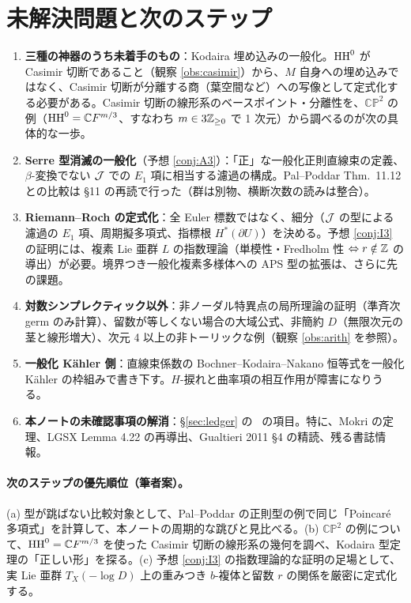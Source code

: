 \section{未解決問題と次のステップ}\label{sec:open}
\begin{enumerate}
\item \textbf{三種の神器のうち未着手のもの}：Kodaira 埋め込みの一般化。$\mathrm{HH}^0$ が Casimir 切断であること（観察 \ref{obs:casimir}）から、$M$ 自身への埋め込みではなく、Casimir 切断が分離する商（葉空間など）への写像として定式化する必要がある。Casimir 切断の線形系のベースポイント・分離性を、$\mathbb{CP}^2$ の例（$\mathrm{HH}^0=\mathbb C F^{m/3}$、すなわち $m\in3\mathbb Z_{\ge0}$ で 1 次元）から調べるのが次の具体的な一歩。
\item \textbf{Serre 型消滅の一般化}（予想 \ref{conj:A3}）：「正」な一般化正則直線束の定義、$\beta$-変換でない $\mathcal J$ での $E_1$ 項に相当する濾過の構成。Pal--Poddar Thm.\ 11.12 との比較は \S11 の再読で行った（群は別物、横断次数の読みは整合）。
\item \textbf{Riemann--Roch の定式化}：全 Euler 標数ではなく、細分（$\mathcal J$ の型による濾過の $E_1$ 項、周期擬多項式、指標根 $H^*(\partial U)$）を決める。予想 \ref{conj:I3} の証明には、複素 Lie 亜群 $L$ の指数理論（単模性・Fredholm 性 $\Leftrightarrow r\notin\mathbb Z$ の導出）が必要。境界つき一般化複素多様体への APS 型の拡張は、さらに先の課題。
\item \textbf{対数シンプレクティック以外}：非ノーダル特異点の局所理論の証明（準斉次 germ のみ計算）、留数が等しくない場合の大域公式、非簡約 $D$（無限次元の茎と線形増大）、次元 4 以上の非トーリックな例（観察 \ref{obs:arith} を参照）。
\item \textbf{一般化 Kähler 側}：直線束係数の Bochner--Kodaira--Nakano 恒等式を一般化 Kähler の枠組みで書き下す。$H$-捩れと曲率項の相互作用が障害になりうる\tK。
\item \textbf{本ノートの未確認事項の解消}：\S\ref{sec:ledger} の \tQ\ の項目。特に、Mokri の定理、LGSX Lemma 4.22 の再導出、Gualtieri 2011 \S4 の精読、残る書誌情報。
\end{enumerate}

\paragraph{次のステップの優先順位（筆者案）。}
(a) 型が跳ばない比較対象として、Pal--Poddar の正則型の例で同じ「Poincaré 多項式」を計算して、本ノートの周期的な跳びと見比べる。(b) $\mathbb{CP}^2$ の例について、$\mathrm{HH}^0=\mathbb C F^{m/3}$ を使った Casimir 切断の線形系の幾何を調べ、Kodaira 型定理の「正しい形」を探る。(c) 予想 \ref{conj:I3} の指数理論的な証明の足場として、実 Lie 亜群 $T_X(-\log D)$ 上の重みつき $b$-複体と留数 $r$ の関係を厳密に定式化する。

